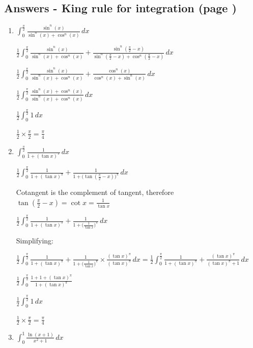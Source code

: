 \documentclass[../main.tex]{subfiles}
\begin{document}
\subsection*{Answers - King rule for integration (page \pageref{Kings rule})}
\label{Kings rule answers}
\begin{enumerate}[itemsep=0.7cm]
    \item 
    $\int_0^{\frac{\pi}{2}}\frac{\sin^n{(x)}}{\sin^n{(x)}+\cos^n{(x)}}\,dx$

    $\frac{1}{2}\int_0^{\frac{\pi}{2}}\frac{\sin^n{(x)}}{\sin^n{(x)}+\cos^n{(x)}}+\frac{\sin^n{(\frac{\pi}{2}-x)}}{\sin^n{(\frac{\pi}{2}-x)}+\cos^n{(\frac{\pi}{2}-x)}}\,dx$

    $\frac{1}{2}\int_0^{\frac{\pi}{2}}\frac{\sin^n{(x)}}{\sin^n{(x)}+\cos^n{(x)}}+\frac{\cos^n{(x)}}{\cos^n{(x)}+\sin^n{(x)}}\,dx$

    $\frac{1}{2}\int_0^{\frac{\pi}{2}}\frac{\sin^n{(x)}+\cos^n{(x)}}{\sin^n{(x)}+\cos^n{(x)}}\,dx$

    $\frac{1}{2}\int_0^{\frac{\pi}{2}}1\,dx$

    $\frac{1}{2}\times \frac{\pi}{2}=\frac{\pi}{4}$

    \item 
    $\int_0^{\frac{\pi}{2}}\frac{1}{1+(\tan{x})^{\pi}}\,dx$

    $\frac{1}{2}\int_0^{\frac{\pi}{2}}\frac{1}{1+(\tan{x})^{\pi}}+\frac{1}{1+\bigl(\tan{(\frac{\pi}{2}-x)}\bigr)^{\pi}}\,dx$

    Cotangent is the complement of tangent, therefore $\tan{(\frac{\pi}{2}-x)}=\cot{x}=\frac{1}{\tan{x}}$

    $\frac{1}{2}\int_0^{\frac{\pi}{2}}\frac{1}{1+(\tan{x})^{\pi}}+\frac{1}{1+\bigl(\frac{1}{\tan{x}}\bigr)^{\pi}}\,dx$

    Simplifying:

    $\frac{1}{2}\int_0^{\frac{\pi}{2}}\frac{1}{1+(\tan{x})^{\pi}}+\frac{1}{1+\bigl(\frac{1}{\tan{x}}\bigr)^{\pi}}\times \frac{(\tan{x})^{\pi}}{(\tan{x})^{\pi}}\,dx=\frac{1}{2}\int_0^{\frac{\pi}{2}} \frac{1}{1+(\tan{x})^{\pi}}+\frac{(\tan{x})^{\pi}}{(\tan{x})^{\pi}+1}\,dx$

    $\frac{1}{2}\int_0^{\frac{\pi}{2}} \frac{1+1+(\tan{x})^{\pi}}{1+(\tan{x})^{\pi}}$

    $\frac{1}{2}\int_0^{\frac{\pi}{2}} 1\,dx$

    $\frac{1}{2}\times \frac{\pi}{2}=\frac{\pi}{4}$

    \item 
    $\int_0^1 \frac{\ln{(x+1)}}{x^2+1}\,dx$
    

\end{enumerate}
\end{document}
